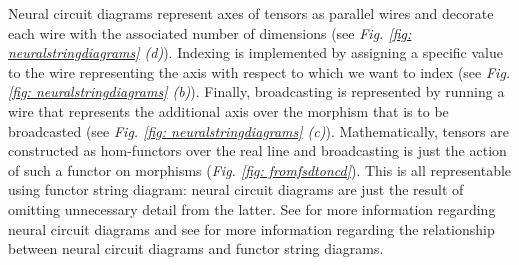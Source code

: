 \documentclass[11pt,a4paper,openright,twoside]{report}
\theoremstyle{plain}
\theoremstyle{definition}
\begin{document}
Neural circuit diagrams represent axes of tensors as parallel wires and decorate each wire with the associated number of dimensions (see \textit{Fig. \ref{fig: neuralstringdiagrams} (d)}). Indexing is implemented by assigning a specific value to the wire representing the axis with respect to which we want to index (see \textit{Fig. \ref{fig: neuralstringdiagrams} (b)}). Finally, broadcasting is represented by running a wire that represents the additional axis over the morphism that is to be broadcasted (see \textit{Fig. \ref{fig: neuralstringdiagrams} (c)}). Mathematically, tensors are constructed as hom-functors over the real line and broadcasting is just the action of such a functor on morphisms (\textit{Fig. \ref{fig: fromfsdtoncd}}). This is all representable using functor string diagram: neural circuit diagrams are just the result of omitting unnecessary detail from the latter. See \cite{abbott2024neural} for more information regarding neural circuit diagrams and see \cite{abbott2023robust} for more information regarding the relationship between neural circuit diagrams and functor string diagrams.
\end{document}
